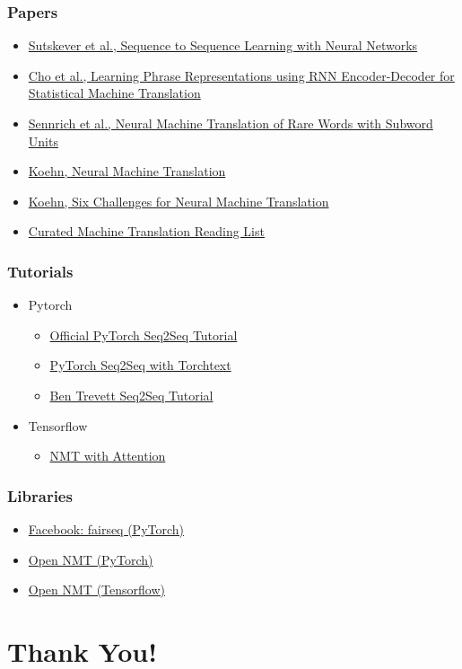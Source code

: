 \documentclass[usenames,dvipsnames]{beamer}
\begin{document}
\begin{frame}
  \frametitle{Papers}
  \begin{itemize}
    \item \href{https://arxiv.org/abs/1409.3215}{Sutskever et al., Sequence to Sequence Learning with Neural Networks}
    \item \href{https://arxiv.org/abs/1406.1078}{Cho et al., Learning Phrase Representations using RNN Encoder-Decoder for Statistical Machine Translation}
    \item \href{https://arxiv.org/pdf/1508.07909}{Sennrich et al., Neural Machine Translation of Rare Words with Subword Units}
    \item \href{https://arxiv.org/abs/1709.07809}{Koehn, Neural Machine Translation}
    \item \href{https://www.aclweb.org/anthology/W17-3204.pdf}{Koehn, Six Challenges for Neural Machine Translation}
    \item \href{https://github.com/THUNLP-MT/MT-Reading-List}{Curated Machine Translation Reading List}
  \end{itemize}
\end{frame}

\begin{frame}
  \frametitle{Tutorials}
  \begin{itemize}
    \item Pytorch
    \begin{itemize}
      \item \href{https://pytorch.org/tutorials/intermediate/seq2seq_translation_tutorial.html}{Official PyTorch Seq2Seq Tutorial}
      \item \href{https://pytorch.org/tutorials/beginner/torchtext_translation_tutorial.html}{PyTorch Seq2Seq with Torchtext}
      \item \href{https://github.com/bentrevett/pytorch-seq2seq}{Ben Trevett Seq2Seq Tutorial}
    \end{itemize}
    \item Tensorflow
    \begin{itemize}
      \item \href{https://www.tensorflow.org/tutorials/text/nmt_with_attention}{NMT with Attention}
    \end{itemize}
  \end{itemize}
\end{frame}

\begin{frame}
\frametitle{Libraries}
  \begin{itemize}
    \item \href{https://github.com/pytorch/fairseq}{Facebook: fairseq (PyTorch)}
    \item \href{https://github.com/OpenNMT/OpenNMT-py}{Open NMT (PyTorch)}
    \item \href{https://github.com/OpenNMT/OpenNMT-tf}{Open NMT (Tensorflow)}
  \end{itemize}
\end{frame}

\section{Thank You!}


\end{document}
